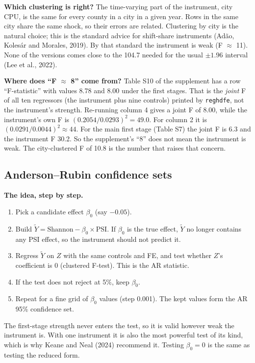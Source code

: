 \documentclass[11pt]{article}
\begin{document}
\textbf{Which clustering is right?} The time-varying part of the instrument, city CPU, is the same for every county in a city in a given year. Rows in the same city share the same shock, so their errors are related. Clustering by city is the natural choice; this is the standard advice for shift-share instruments (Ad\~ao, Koles\'ar and Morales, 2019). By that standard the instrument is weak (F $\approx$ 11). None of the versions comes close to the 104.7 needed for the usual $\pm1.96$ interval (Lee et al., 2022).

\begin{answerbox}
\textbf{Where does ``F $\approx$ 8'' come from?} Table S10 of the supplement has a row ``F-statistic'' with values 8.78 and 8.00 under the first stages. That is the \emph{joint} F of all ten regressors (the instrument plus nine controls) printed by \texttt{reghdfe}, not the instrument's strength. Re-running column 4 gives a joint F of 8.00, while the instrument's own F is $(0.2054/0.0293)^2 = 49.0$. For column 2 it is $(0.0291/0.0044)^2 \approx 44$. For the main first stage (Table S7) the joint F is 6.3 and the instrument F 30.2. So the supplement's ``8'' does not mean the instrument is weak. The city-clustered F of 10.8 is the number that raises that concern.
\end{answerbox}

\subsection{Anderson--Rubin confidence sets}
\textbf{The idea, step by step.}
\begin{enumerate}[leftmargin=18pt,itemsep=1pt]
\item Pick a candidate effect $\beta_0$ (say $-0.05$).
\item Build $\tilde Y = \text{Shannon} - \beta_0 \times \text{PSI}$. If $\beta_0$ is the true effect, $\tilde Y$ no longer contains any PSI effect, so the instrument should not predict it.
\item Regress $\tilde Y$ on $Z$ with the same controls and FE, and test whether $Z$'s coefficient is 0 (clustered F-test). This is the AR statistic.
\item If the test does not reject at 5\%, keep $\beta_0$.
\item Repeat for a fine grid of $\beta_0$ values (step 0.001). The kept values form the AR 95\% confidence set.
\end{enumerate}
The first-stage strength never enters the test, so it is valid however weak the instrument is. With one instrument it is also the most powerful test of its kind, which is why Keane and Neal (2024) recommend it. Testing $\beta_0 = 0$ is the same as testing the reduced form.
\end{document}
